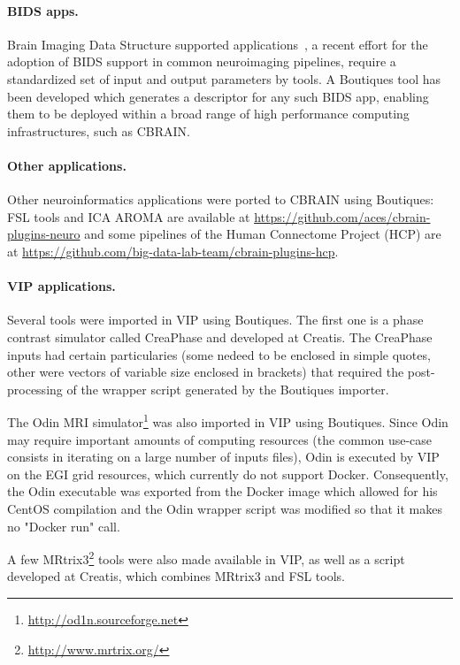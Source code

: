 \documentclass{article}
\newcommand{\boutiques}{Boutiques\xspace}
\begin{document}
\paragraph{BIDS apps.} Brain Imaging Data Structure supported
applications~\cite{gorgolewski2017bids}, a recent effort for the adoption of BIDS support
in common neuroimaging pipelines, require a standardized set of input and output parameters
by tools. A \boutiques tool has been developed which generates a descriptor for any such
BIDS app, enabling them to be deployed within a broad range of high performance computing
infrastructures, such as CBRAIN.

\paragraph{Other applications.} Other neuroinformatics applications were ported to CBRAIN using \boutiques:
FSL tools and ICA AROMA are available at
\url{https://github.com/aces/cbrain-plugins-neuro} and some pipelines
of the Human Connectome Project (HCP) are at
\url{https://github.com/big-data-lab-team/cbrain-plugins-hcp}.

\paragraph{VIP applications.} Several tools were imported in VIP using \boutiques. 
The first one is a phase contrast simulator called CreaPhase and developed at Creatis. 
The CreaPhase inputs had certain particularies (some nedeed to be enclosed 
in simple quotes, other were vectors of variable size enclosed in brackets)
that required the post-processing of the wrapper script generated by the
Boutiques importer. 

The Odin MRI simulator\footnote{\url{http://od1n.sourceforge.net}} was also imported 
in VIP using \boutiques. Since Odin  may require important amounts of computing resources 
(the common use-case consists in iterating on a large number of inputs files), Odin is 
executed by VIP on the EGI grid resources, which currently do not support Docker. Consequently, 
the Odin executable was exported from the Docker image which allowed for his CentOS compilation
and the Odin wrapper script was modified so that it makes no "Docker run" call.

A few MRtrix3\footnote{\url{http://www.mrtrix.org/}} tools were also made available in VIP, as well as 
a script developed at Creatis, which combines MRtrix3 and FSL tools.
\end{document}
